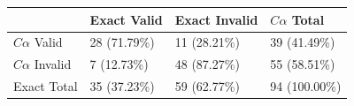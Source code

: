 \begin{tabular}{llll}
\toprule
 & Exact Valid & Exact Invalid & $C\alpha$ Total \\
\midrule
$C\alpha$ Valid & 28 (71.79\%) & 11 (28.21\%) & 39 (41.49\%) \\
$C\alpha$ Invalid & 7 (12.73\%) & 48 (87.27\%) & 55 (58.51\%) \\
Exact Total & 35 (37.23\%) & 59 (62.77\%) & 94 (100.00\%) \\
\bottomrule
\end{tabular}
